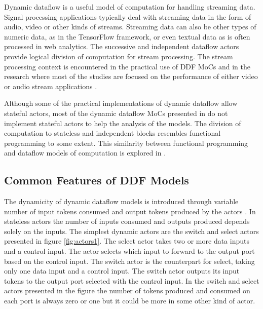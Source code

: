 \documentclass[conference,a4paper]{IEEEtran}
\begin{document}
Dynamic dataflow is a useful model of computation for handling streaming data.
Signal processing applications typically deal with streaming data in the form of
audio, video or other kinds of streams. Streaming data can also be other types
of numeric data, as in the TensorFlow framework, or even textual data as is
often processed in web analytics. The successive and independent dataflow actors
provide logical division of computation for stream processing. The stream
processing context is encountered in the practical use of DDF MoCs
\cite{eker2003cal, tensorflow2015-whitepaper} and in the research where most of
the studies are focused on the performance of either video or audio stream
applications \cite{bhattacharyya2013handbook, roquier2008automatic,
ersfolk2014scheduling}.

Although some of the practical implementations of dynamic dataflow
\cite{tensorflow2015-whitepaper, eker2003cal} allow stateful actors, most of the
dynamic dataflow MoCs presented in \cite{bhattacharyya2013handbook} do not
implement stateful actors to help the analysis of the models. The division of
computation to stateless and independent blocks resembles functional programming
to some extent. This similarity between functional programming and dataflow
models of computation is explored in \cite{reekie1995realtime}.

\subsection{Common Features of DDF Models}
The dynamicity of dynamic dataflow models is introduced through variable number
of input tokens consumed and output tokens produced by the actors
\cite{bhattacharyya2013handbook}. In stateless actors the number of inputs
consumed and outputs produced depends solely on the inputs. The simplest dynamic
actors are the switch and select actors presented in figure \ref{fig:actors1}.
The select actor takes two or more data inputs and a control input. The actor
selects which input to forward to the output port based on the control input. The
switch actor is the counterpart for select, taking only one data input and a
control input. The switch actor outputs its input tokens to the output port
selected with the control input. \cite{lee2015introduction} In the switch and
select actors presented in the figure the number of tokens produced and consumed
on each port is always zero or one but it could be more in some other kind of
actor.
\end{document}
